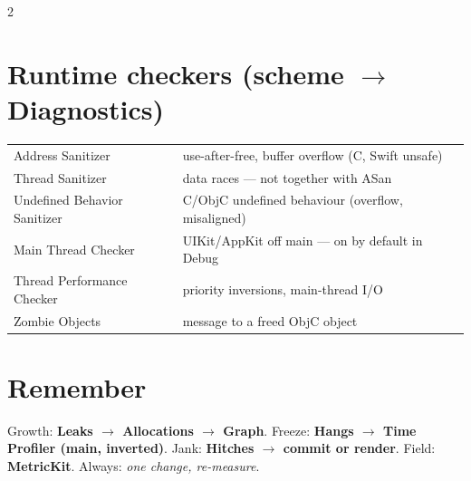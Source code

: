 \documentclass[8pt]{extarticle}
\begin{document}
\begin{multicols}{2}
\section{Runtime checkers (scheme $\to$ Diagnostics)}
{\footnotesize
\begin{tabular}{@{}l l@{}}
\toprule
Address Sanitizer & use-after-free, buffer overflow (C, Swift unsafe) \\
Thread Sanitizer & data races — not together with ASan \\
Undefined Behavior Sanitizer & C/ObjC undefined behaviour (overflow, misaligned) \\
Main Thread Checker & UIKit/AppKit off main — on by default in Debug \\
Thread Performance Checker & priority inversions, main-thread I/O \\
Zombie Objects & message to a freed ObjC object \\
\bottomrule
\end{tabular}}

\section{Remember}
Growth: \textbf{Leaks $\to$ Allocations $\to$ Graph}. Freeze: \textbf{Hangs $\to$ Time
Profiler (main, inverted)}. Jank: \textbf{Hitches $\to$ commit or render}. Field:
\textbf{MetricKit}. Always: \emph{one change, re-measure}.


\end{multicols}

\end{document}
